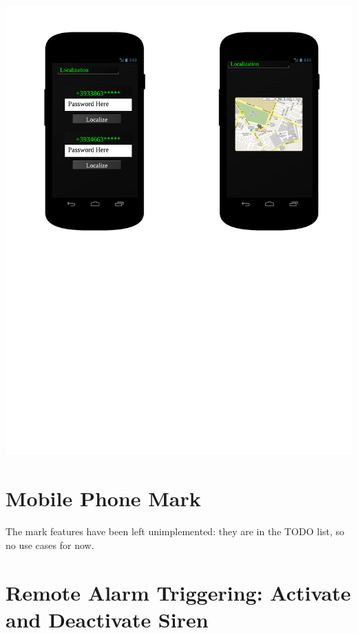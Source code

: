 \includegraphics[scale=0.7]{images/Localization_mobile}

\section{Mobile Phone Mark}
The mark features have been left unimplemented: they are in the TODO list,
so no use cases for now.


\newpage


\section{Remote Alarm Triggering: Activate and Deactivate Siren}

